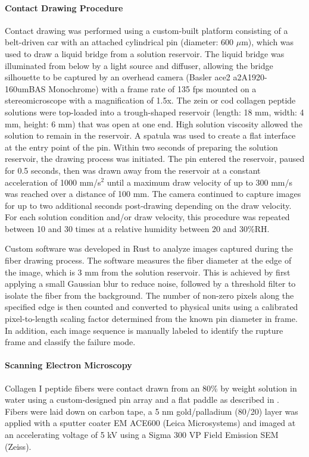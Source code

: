 \documentclass[lineno]{JFM-FLM_Au}
\begin{document}
\paragraph*{Contact Drawing Procedure}
Contact drawing was performed using a custom-built platform consisting of a belt-driven car with an attached cylindrical pin (diameter: 600 $\mu$m), which was used to draw a liquid bridge from a solution reservoir. The liquid bridge was illuminated from below by a light source and diffuser, allowing the bridge silhouette to be captured by an overhead camera (Basler ace2 a2A1920-160umBAS Monochrome) with a frame rate of 135 fps mounted on a stereomicroscope with a magnification of 1.5x. The zein or cod collagen peptide solutions were top-loaded into a trough-shaped reservoir (length: 18 mm, width: 4 mm, height: 6 mm) that was open at one end. High solution viscosity allowed the solution to remain in the reservoir. A spatula was used to create a flat interface at the entry point of the pin. Within two seconds of preparing the solution reservoir, the drawing process was initiated. The pin entered the reservoir, paused for 0.5 seconds, then was drawn away from the reservoir at a constant acceleration of 1000 mm/s$^2$ until a maximum draw velocity of up to 300 mm/s was reached over a distance of 100 mm. The camera continued to capture images for up to two additional seconds post-drawing depending on the draw velocity. For each solution condition and/or draw velocity, this procedure was repeated between 10 and 30 times at a relative humidity between 20 and 30\%RH. 
 
Custom software was developed in Rust to analyze images captured during the fiber drawing process. The software measures the fiber diameter at the edge of the image, which is 3 mm from the solution reservoir. This is achieved by first applying a small Gaussian blur to reduce noise, followed by a threshold filter to isolate the fiber from the background. The number of non-zero pixels along the specified edge is then counted and converted to physical units using a calibrated pixel-to-length scaling factor determined from the known pin diameter in frame. In addition, each image sequence is manually labeled to identify the rupture frame and classify the failure mode.
 
\paragraph*{Scanning Electron Microscopy}
Collagen I peptide fibers were contact drawn from an 80\% by weight solution in water using a custom-designed pin array and a flat paddle as described in \cite{yaghoobi_multifilament_2023}. Fibers were laid down on carbon tape, a 5 nm gold/palladium (80/20) layer was applied with a sputter coater EM ACE600 (Leica Microsystems) and imaged at an accelerating voltage of 5 kV using a Sigma 300 VP Field Emission SEM (Zeiss).
\end{document}
